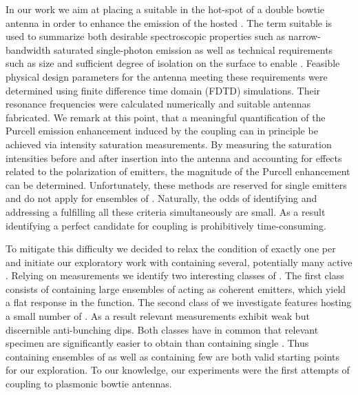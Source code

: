    In our work we aim at placing a suitable \nd in the hot-spot of a double bowtie antenna in order to enhance the emission of the hosted \sivs.
   The term suitable is used to summarize both desirable spectroscopic properties such as narrow-bandwidth saturated single-photon emission as well as technical requirements such as \nd size and sufficient degree of isolation on the surface to enable \pp. 
   Feasible physical design parameters for the antenna meeting these requirements were determined using finite difference time domain (FDTD) simulations. Their resonance frequencies were calculated numerically and suitable antennas fabricated.
   We remark at this point, that a meaningful quantification of the Purcell emission enhancement induced by the coupling can in principle be achieved via intensity saturation measurements. By measuring the saturation intensities before and after insertion into the antenna and accounting for effects related to the polarization of emitters, the magnitude of the Purcell enhancement can be determined. Unfortunately, these methods are reserved for single emitters and do not apply for ensembles of \sivs. Naturally, the odds of identifying and addressing a \nd fulfilling all these criteria simultaneously are small. As a result identifying a perfect candidate for coupling is prohibitively time-consuming.

	 To mitigate this difficulty we decided to relax the condition of exactly one \siv per \nd and initiate our exploratory work with \nds containing several, potentially many active \sivs. Relying on \gtz measurements we identify two interesting classes of \nds. The first class consists of \nds containing large ensembles of \sivs acting as coherent emitters, which yield a flat response in the \gtz function. The second class of \nds we investigate features \nds hosting a small number of \sivs. As a result relevant \gtz measurements exhibit weak but discernible anti-bunching dips. Both classes have in common that relevant \nd specimen are significantly easier to obtain than \nds containing single \sivs. Thus \nds containing ensembles of \sivs as well as \nds containing few \sivs are both valid starting points for our exploration. To our knowledge, our experiments were the first attempts of coupling \sivs to plasmonic bowtie antennas.


